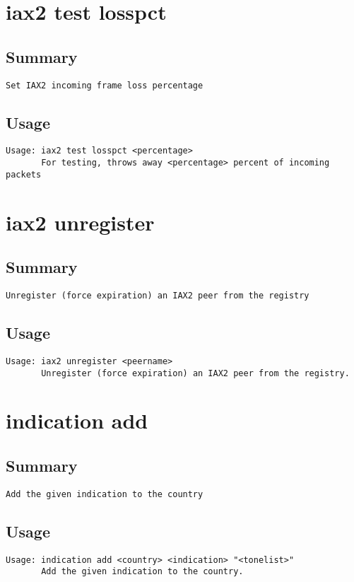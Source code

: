 \section{iax2 test losspct}
\subsection{Summary}
\begin{verbatim}
Set IAX2 incoming frame loss percentage
\end{verbatim}
\subsection{Usage}
\begin{verbatim}
Usage: iax2 test losspct <percentage>
       For testing, throws away <percentage> percent of incoming packets

\end{verbatim}


\section{iax2 unregister}
\subsection{Summary}
\begin{verbatim}
Unregister (force expiration) an IAX2 peer from the registry
\end{verbatim}
\subsection{Usage}
\begin{verbatim}
Usage: iax2 unregister <peername>
       Unregister (force expiration) an IAX2 peer from the registry.

\end{verbatim}


\section{indication add}
\subsection{Summary}
\begin{verbatim}
Add the given indication to the country
\end{verbatim}
\subsection{Usage}
\begin{verbatim}
Usage: indication add <country> <indication> "<tonelist>"
       Add the given indication to the country.

\end{verbatim}


